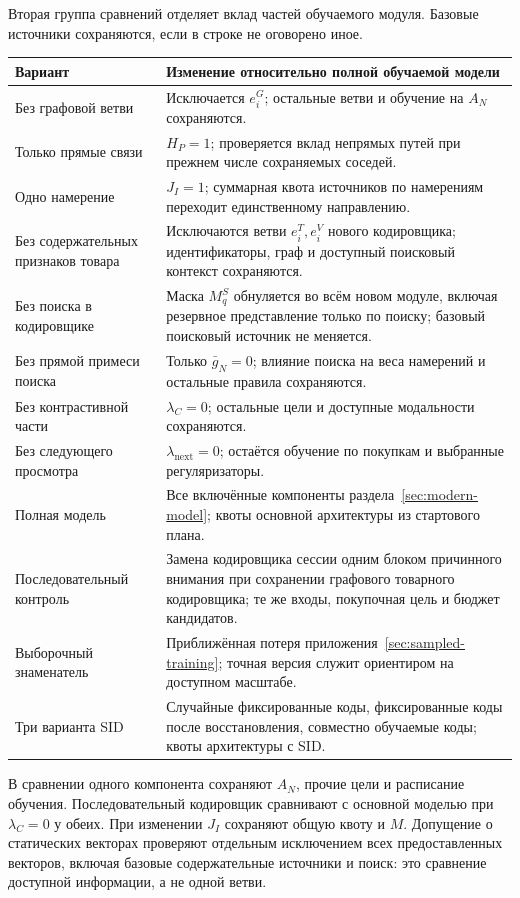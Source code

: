 \documentclass[12pt,a4paper]{article}
\theoremstyle{plainru}
\begin{document}
Вторая группа сравнений отделяет вклад частей обучаемого модуля.
Базовые источники сохраняются, если в строке не оговорено иное.
\begin{longtable}{L{0.25\textwidth}L{0.65\textwidth}}
\toprule Вариант & Изменение относительно полной обучаемой модели \\\midrule\endhead
Без графовой ветви & Исключается $e_i^G$; остальные ветви и обучение
на $A_N$ сохраняются. \\
Только прямые связи & $H_P=1$; проверяется вклад непрямых путей
при прежнем числе сохраняемых соседей. \\
Одно намерение & $J_I=1$; суммарная квота источников по намерениям
переходит единственному направлению. \\
Без содержательных признаков товара & Исключаются ветви $e_i^T,e_i^V$ нового
кодировщика; идентификаторы, граф и доступный поисковый контекст сохраняются. \\
Без поиска в кодировщике & Маска $M_q^S$ обнуляется во всём новом
модуле, включая резервное представление только по поиску;
базовый поисковый источник не меняется. \\
Без прямой примеси поиска & Только $\bar g_N=0$; влияние поиска
на веса намерений и остальные правила сохраняются. \\
Без контрастивной части & $\lambda_C=0$; остальные цели и доступные
модальности сохраняются. \\
Без следующего просмотра & $\lambda_{\mathrm{next}}=0$; остаётся
обучение по покупкам и выбранные регуляризаторы. \\
Полная модель & Все включённые компоненты раздела~\ref{sec:modern-model};
квоты основной архитектуры из стартового плана. \\
Последовательный контроль & Замена кодировщика сессии одним
блоком причинного внимания при сохранении графового товарного
кодировщика; те же входы, покупочная цель и бюджет кандидатов. \\
Выборочный знаменатель & Приближённая потеря
приложения~\ref{sec:sampled-training}; точная версия служит ориентиром
на доступном масштабе. \\
Три варианта SID & Случайные фиксированные коды, фиксированные коды
после восстановления, совместно обучаемые коды; квоты архитектуры с SID. \\
\bottomrule
\end{longtable}

В сравнении одного компонента сохраняют $A_N$, прочие цели
и расписание обучения. Последовательный кодировщик сравнивают
с основной моделью при $\lambda_C=0$ у обеих. При изменении $J_I$
сохраняют общую квоту и $M$. Допущение о статических векторах
проверяют отдельным исключением всех предоставленных векторов,
включая базовые содержательные источники и поиск: это сравнение
доступной информации, а не одной ветви.
\end{document}
